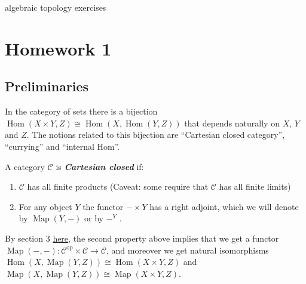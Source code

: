 \documentclass{article}
\numberwithin{equation}{section}
\newcommand{\Cc}{\mathcal{C}}
\DeclareMathOperator{\Hom}{Hom}
\DeclareMathOperator{\Map}{Map}
\DeclareMathOperator{\op}{op}
\begin{document}
{\LARGE algebraic topology exercises}
\tableofcontents
\section{Homework 1}
\setcounter{subsection}{-1}
\subsection{Preliminaries}
	In the category of sets there is a bijection $\Hom(X\times Y, Z)\cong \Hom(X, \Hom(Y, Z))$ that depends naturally on $X$, $Y$ and $Z$. The notions related to this bijection are “Cartesian closed category”, “currying” and “internal Hom”.
\begin{defn}
	A category $\Cc$ is \textbf{\textit{Cartesian closed}} if:
	\begin{enumerate}
		\item $\Cc$ has all finite products (Caveat: some require that $\Cc$ has all finite limits)
		\item For any object $Y$ the functor $- \times Y$ has a right adjoint, which we will denote by $\Map(Y,-)$ or by $-^Y$ .
	\end{enumerate}
\end{defn}
\begin{remark}
	By section 3 \href{https://ncatlab.org/nlab/show/internal+hom }{here}, the second property above implies that we get a functor $\Map(-,-) : \Cc^{\op} \times \Cc \to \Cc$, and moreover we get natural isomorphisms $\Hom(X, \Map(Y, Z)) \cong \Hom(X \times Y, Z)$ and $\Map(X, \Map(Y, Z))\cong \Map(X \times Y, Z)$.
\end{remark}
\end{document}
